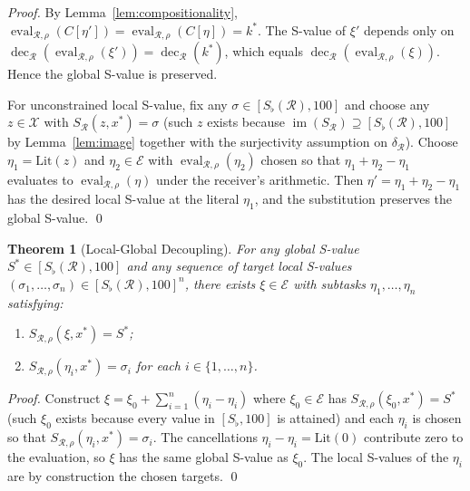 \documentclass[twocolumn,a4paper]{article}
\newtheorem{theorem}{Theorem}[section]
\DeclareMathOperator{\img}{im}
\DeclareMathOperator{\eval}{eval}
\DeclareMathOperator{\dec}{dec}
\newcommand{\Cands}{\mathcal{X}}
\newcommand{\Expr}{\mathcal{E}}
\newcommand{\receiver}{\mathcal{R}}
\newcommand{\Sscalar}{S}
\newcommand{\Sfloor}{S_{\flat}}
\begin{document}
\begin{proof}
By Lemma~\ref{lem:compositionality}, $\eval_{\receiver,\rho}(C[\eta'])=\eval_{\receiver,\rho}(C[\eta])=k^{*}$. The S-value of $\xi'$ depends only on $\dec_{\receiver}(\eval_{\receiver,\rho}(\xi'))=\dec_{\receiver}(k^{*})$, which equals $\dec_{\receiver}(\eval_{\receiver,\rho}(\xi))$. Hence the global S-value is preserved.

For unconstrained local S-value, fix any $\sigma\in[\Sfloor(\receiver),100]$ and choose any $z\in\Cands$ with $\Sscalar_{\receiver}(z,x^{*})=\sigma$ (such $z$ exists because $\img(\Sscalar_{\receiver})\supseteq[\Sfloor(\receiver),100]$ by Lemma~\ref{lem:image} together with the surjectivity assumption on $\delta_{\receiver}$). Choose $\eta_{1}=\mathrm{Lit}(z)$ and $\eta_{2}\in\Expr$ with $\eval_{\receiver,\rho}(\eta_{2})$ chosen so that $\eta_{1}+\eta_{2}-\eta_{1}$ evaluates to $\eval_{\receiver,\rho}(\eta)$ under the receiver's arithmetic. Then $\eta'=\eta_{1}+\eta_{2}-\eta_{1}$ has the desired local S-value at the literal $\eta_{1}$, and the substitution preserves the global S-value. \qed
\end{proof}

\begin{theorem}[Local-Global Decoupling]
\label{thm:lg-decoupling}
For any global S-value $\Sscalar^{*}\in[\Sfloor(\receiver),100]$ and any sequence of target local S-values $(\sigma_{1},\ldots,\sigma_{n})\in[\Sfloor(\receiver),100]^{n}$, there exists $\xi\in\Expr$ with subtasks $\eta_{1},\ldots,\eta_{n}$ satisfying:
\begin{enumerate}[nosep,label=(\roman*)]
\item $\Sscalar_{\receiver,\rho}(\xi,x^{*})=\Sscalar^{*}$;
\item $\Sscalar_{\receiver,\rho}(\eta_{i},x^{*})=\sigma_{i}$ for each $i\in\{1,\ldots,n\}$.
\end{enumerate}
\end{theorem}

\begin{proof}
Construct $\xi=\xi_{0}+\sum_{i=1}^{n}(\eta_{i}-\eta_{i})$ where $\xi_{0}\in\Expr$ has $\Sscalar_{\receiver,\rho}(\xi_{0},x^{*})=\Sscalar^{*}$ (such $\xi_{0}$ exists because every value in $[\Sfloor,100]$ is attained) and each $\eta_{i}$ is chosen so that $\Sscalar_{\receiver,\rho}(\eta_{i},x^{*})=\sigma_{i}$. The cancellations $\eta_{i}-\eta_{i}=\mathrm{Lit}(0)$ contribute zero to the evaluation, so $\xi$ has the same global S-value as $\xi_{0}$. The local S-values of the $\eta_{i}$ are by construction the chosen targets. \qed
\end{proof}
\end{document}
